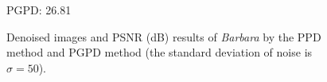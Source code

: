 \begin{figure}[ht!]
{\begin{minipage}[t]{0.24\textwidth}
{\footnotesize PGPD: 26.81}
\end{minipage}
}\vspace{-3mm}
    \caption{Denoised images and PSNR (dB) results of \textsl{Barbara} by the PPD method and PGPD method (the standard deviation of noise is $\sigma=50$).}
    \label{fig2-8}
\end{figure}


\begin{figure}[ht!]
    \centering
{}
\end{figure}
